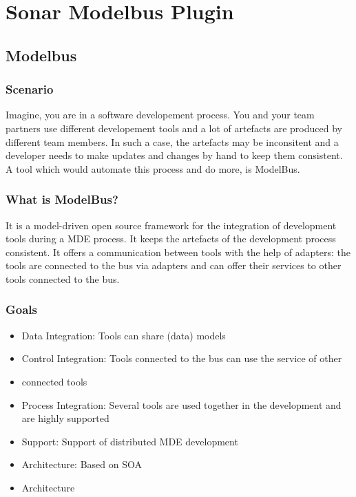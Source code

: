 \chapter{Sonar Modelbus Plugin} \label{sec:sonar_modelbus_plungin}

\section{Modelbus} \label{sec:modelbus}
\subsection{Scenario}

Imagine, you are in a software developement process. You and your team partners use different developement tools and a lot of artefacts are produced by different team members. In such a case, the artefacts may be inconsitent and a developer needs to make updates and changes by hand to keep them consistent. A tool which would automate this process and do more, is ModelBus.

\subsection{What is ModelBus?}

It is a model-driven open source framework for the integration of development tools during a MDE process. It keeps the artefacts of the development process consistent. It offers a communication between tools with the help of adapters: the tools are connected to the bus via adapters and can offer their services to other tools connected to the bus.

\subsection{Goals}
\begin{itemize}
\item Data Integration: Tools can share (data) models
\item Control Integration: Tools connected to the bus can use the service of other \item connected tools
\item Process Integration: Several tools are used together in the development and are highly supported
\item Support: Support of distributed MDE development
\item Architecture: Based on SOA
\item Architecture
\end{itemize}

